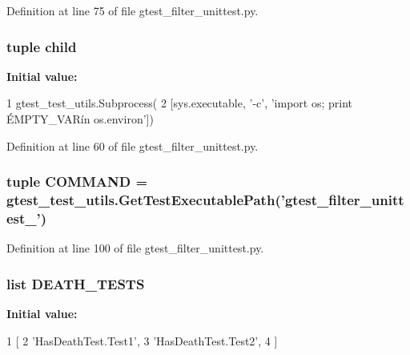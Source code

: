 \-Definition at line 75 of file gtest\-\_\-filter\-\_\-unittest.\-py.

\hypertarget{namespacegtest__filter__unittest_a74580d02ef7af2ae9bcc43f9032eb7fb}{
\subsubsection[{child}]{\setlength{\rightskip}{0pt plus 5cm}tuple {\bf child}}}\label{d5/dea/namespacegtest__filter__unittest_a74580d02ef7af2ae9bcc43f9032eb7fb}
{\bfseries \-Initial value\-:}
\begin{DoxyCode}
1 gtest_test_utils.Subprocess(
2     [sys.executable, '-c', 'import os; print \'EMPTY_VAR\' in os.environ'])
\end{DoxyCode}


\-Definition at line 60 of file gtest\-\_\-filter\-\_\-unittest.\-py.

\hypertarget{namespacegtest__filter__unittest_add010199942a26d17bd560c1ce462eeb}{
\subsubsection[{\-C\-O\-M\-M\-A\-N\-D}]{\setlength{\rightskip}{0pt plus 5cm}tuple {\bf \-C\-O\-M\-M\-A\-N\-D} = {\bf gtest\-\_\-test\-\_\-utils.\-Get\-Test\-Executable\-Path}('gtest\-\_\-filter\-\_\-unittest\-\_\-')}}\label{d5/dea/namespacegtest__filter__unittest_add010199942a26d17bd560c1ce462eeb}


\-Definition at line 100 of file gtest\-\_\-filter\-\_\-unittest.\-py.

\hypertarget{namespacegtest__filter__unittest_aface76eca4f60b7f322f330f1c53dec0}{
\subsubsection[{\-D\-E\-A\-T\-H\-\_\-\-T\-E\-S\-T\-S}]{\setlength{\rightskip}{0pt plus 5cm}list {\bf \-D\-E\-A\-T\-H\-\_\-\-T\-E\-S\-T\-S}}}\label{d5/dea/namespacegtest__filter__unittest_aface76eca4f60b7f322f330f1c53dec0}
{\bfseries \-Initial value\-:}
\begin{DoxyCode}
1 [
2     'HasDeathTest.Test1',
3     'HasDeathTest.Test2',
4     ]
\end{DoxyCode}


